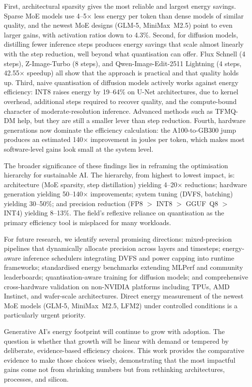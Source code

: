 \documentclass[AMS,STIX2COL]{WileyNJD-v2}
\begin{document}
First, architectural sparsity gives the most reliable and largest energy savings. Sparse MoE models use 4--5$\times$ less energy per token than dense models of similar quality, and the newest MoE designs (GLM-5, MiniMax~M2.5) point to even larger gains, with activation ratios down to 4.3\%. Second, for diffusion models, distilling fewer inference steps produces energy savings that scale almost linearly with the step reduction, well beyond what quantisation can offer. Flux Schnell (4 steps), Z-Image-Turbo (8 steps), and Qwen-Image-Edit-2511 Lightning (4 steps, 42.55$\times$ speedup) all show that the approach is practical and that quality holds up. Third, naive quantisation of diffusion models actively works against energy efficiency: INT8 raises energy by 19--64\% on U-Net architectures, due to kernel overhead, additional steps required to recover quality, and the compute-bound character of moderate-resolution inference. Advanced methods such as TFMQ-DM help, but they are still a smaller lever than step reduction. Fourth, hardware generations now dominate the efficiency calculation: the A100-to-GB300 jump produces an estimated 140$\times$ improvement in joules per token, which makes most software-level gains look small at the system level.

The broader significance of these findings lies in reframing the optimisation hierarchy for sustainable AI. The hierarchy, from highest to lowest impact, is: architecture (MoE sparsity, step distillation) yielding 4--20$\times$ reductions; hardware generation yielding 50--140$\times$ improvements; system tuning (DVFS, batching) yielding 30--50\%; and precision reduction (FP8 $>$ INT8 $>$ GGUF~Q8 $>$ INT4) yielding 8--13\%. The field's reflexive reliance on quantisation as the primary efficiency tool is misplaced for many workloads.

For future research, we identify several promising directions: mixed-precision pipelines that dynamically allocate precision across layers and timesteps; energy-aware inference schedulers integrating DVFS and power capping into runtime frameworks; standardised energy benchmarks extending MLPerf and community leaderboards; quantisation-aware training for diffusion models; and comprehensive cross-hardware validation on non-NVIDIA platforms including TPUs, AMD Instinct, and wafer-scale architectures. Direct energy measurement of the newest MoE models (GLM-5, MiniMax~M2.5, LFM2) under controlled conditions is a particularly urgent priority.

Generative AI's energy footprint will continue to grow with adoption. The question is whether that growth will be linear with demand or tempered by deliberate, evidence-based efficiency choices. This work provides the comparative evidence to make those choices wisely, demonstrating that the most impactful gains come not from shrinking numbers but from rethinking architectures, processes, and silicon.
\end{document}

